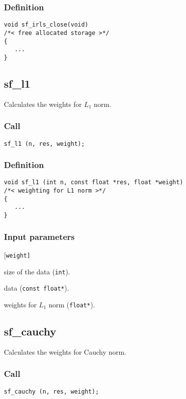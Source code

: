 \subsubsection*{Definition}
\begin{verbatim}
void sf_irls_close(void) 
/*< free allocated storage >*/
{
   ...
}
\end{verbatim}




\subsection{{sf\_l1}}
Calculates the weights for $L_1$ norm.

\subsubsection*{Call}
\begin{verbatim}sf_l1 (n, res, weight);\end{verbatim}

\subsubsection*{Definition}
\begin{verbatim}
void sf_l1 (int n, const float *res, float *weight)  
/*< weighting for L1 norm >*/
{
   ...
}
\end{verbatim}

\subsubsection*{Input parameters}
\begin{desclist}{\tt }{\quad}[\tt weight]
   \setlength\itemsep{0pt}
   \item[n]      size of the data (\texttt{int}).  
   \item[res]    data (\texttt{const float*}).  
   \item[weight] weights for $L_1$ norm (\texttt{float*}).  
\end{desclist}




\subsection{{sf\_cauchy}}
Calculates the weights for Cauchy norm.

\subsubsection*{Call}
\begin{verbatim}sf_cauchy (n, res, weight);\end{verbatim}

